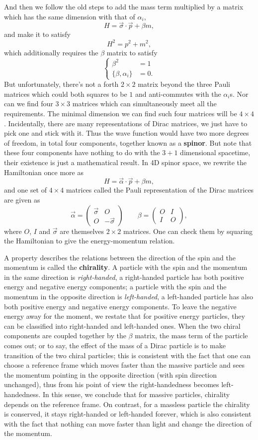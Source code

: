 \documentclass{article}
\newcommand{\be}{\begin{equation}}
\newcommand{\ee}{\end{equation}}
\newcommand{\ba}{\begin{array}}
\newcommand{\ea}{\end{array}}
\renewcommand{\1}{\left}
\renewcommand{\2}{\right}
\newcommand{\al}{\alpha}
\newcommand{\bet}{\beta}
\newcommand{\sig}{\sigma}
\begin{document}
And then we follow the old steps to add the mass term multiplied by a matrix which has the same dimension with that of $\al_i$,
\be H=\vec\sig\cdot\vec p+\bet m, \ee
and make it to satisfy
\be H^2=p^2+m^2, \ee
which additionally requires the $\bet$ matrix to satisfy
\be\1\{\begin{split}
\bet^2&=1\\
\{\bet,\al_i\}&=0.
\end{split}\2.\ee
But unfortunately, there's not a forth $2\times 2$ matrix beyond the three Pauli matrices which could both squares to be $1$ and anti-commutes with the $\al_i$s. Nor can we find four $3\times 3$ matrices which can simultaneously meet all the requirements. The minimal dimension we can find such four matrices will be $4\times 4$. Incidentally, there are many representations of Dirac matrices, we just have to pick one and stick with it. Thus the wave function would have two more degrees of freedom, in total four components, together known as a \textbf{spinor}. But note that these four components have nothing to do with the $3+1$ dimensional spacetime, their existence is just a mathematical result. In 4D spinor space, we rewrite the Hamiltonian once more as 
\be H=\vec\al\cdot\vec p+\bet m, \ee
and one set of $4\times 4$ matrices called the Pauli representation of the Dirac matrices are given as
\be 
\vec\al=\1(\ba{cc}\vec\sig&O\\O&-\vec\sig\ea\2) \quad\quad \bet=\1(\ba{cc}O&I\\I&O\ea\2),
\ee
where $O$, $I$ and $\vec\sig$ are themselves $2\times 2$ matrices. One can check them by squaring the Hamiltonian to give the energy-momentum relation.

A property describes the relations between the direction of the spin and the momentum is called the \textbf{chirality}. A particle with the spin and the momentum in the same direction is \textit{right-handed}, a right-handed particle has both positive energy and negative energy components; a particle with the spin and the momentum in the opposite direction is \textit{left-handed}, a left-handed particle has also both positive energy and negative energy components. To leave the negative energy away for the moment, we restate that for positive energy particles, they can be classified into right-handed and left-handed ones. When the two chiral components are coupled together by the $\bet$ matrix, the mass term of the particle comes out; or to say, the effect of the mass of a Dirac particle is to make transition of the two chiral particles; this is consistent with the fact that one can choose a reference frame which moves faster than the massive particle and sees the momentum pointing in the opposite direction (with spin direction unchanged), thus from his point of view the right-handedness becomes left-handedness. In this sense, we conclude that for massive particles, chirality depends on the reference frame. On contrast, for a massless particle the chirality is conserved, it stays right-handed or left-handed forever, which is also consistent with the fact that nothing can move faster than light and change the direction of  the momentum.
\end{document}
